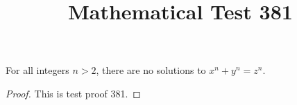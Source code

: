 \documentclass{amsart}
\begin{document}
\title{Mathematical Test 381}
\begin{theorem}
For all integers $n > 2$, there are no solutions to $x^n + y^n = z^n$.
\end{theorem}
\begin{proof}
This is test proof 381.
\end{proof}
\end{document}
